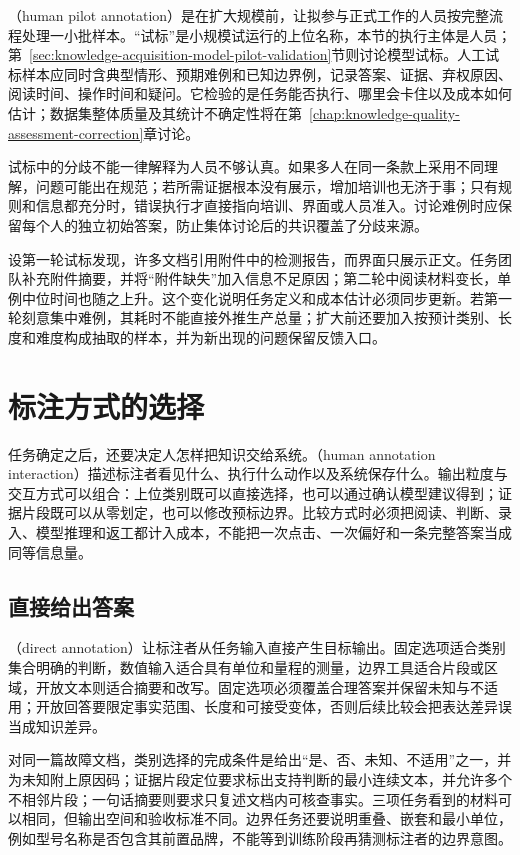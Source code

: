 （human pilot annotation）是在扩大规模前，让拟参与正式工作的人员按完整流程处理一小批样本。“试标”是小规模试运行的上位名称，本节的执行主体是人员；第~\ref{sec:knowledge-acquisition-model-pilot-validation}节则讨论模型试标。人工试标样本应同时含典型情形、预期难例和已知边界例，记录答案、证据、弃权原因、阅读时间、操作时间和疑问。它检验的是任务能否执行、哪里会卡住以及成本如何估计；数据集整体质量及其统计不确定性将在第~\ref{chap:knowledge-quality-assessment-correction}章讨论。

试标中的分歧不能一律解释为人员不够认真。如果多人在同一条款上采用不同理解，问题可能出在规范；若所需证据根本没有展示，增加培训也无济于事；只有规则和信息都充分时，错误执行才直接指向培训、界面或人员准入。讨论难例时应保留每个人的独立初始答案，防止集体讨论后的共识覆盖了分歧来源。

设第一轮试标发现，许多文档引用附件中的检测报告，而界面只展示正文。任务团队补充附件摘要，并将“附件缺失”加入信息不足原因；第二轮中阅读材料变长，单例中位时间也随之上升。这个变化说明任务定义和成本估计必须同步更新。若第一轮刻意集中难例，其耗时不能直接外推生产总量；扩大前还要加入按预计类别、长度和难度构成抽取的样本，并为新出现的问题保留反馈入口。

\section{标注方式的选择}
\label{sec:knowledge-acquisition-human-interaction}

任务确定之后，还要决定人怎样把知识交给系统。（human annotation interaction）描述标注者看见什么、执行什么动作以及系统保存什么。输出粒度与交互方式可以组合：上位类别既可以直接选择，也可以通过确认模型建议得到；证据片段既可以从零划定，也可以修改预标边界。比较方式时必须把阅读、判断、录入、模型推理和返工都计入成本，不能把一次点击、一次偏好和一条完整答案当成同等信息量。

\subsection{直接给出答案}
\label{sec:knowledge-acquisition-human-direct-answer}

（direct annotation）让标注者从任务输入直接产生目标输出。固定选项适合类别集合明确的判断，数值输入适合具有单位和量程的测量，边界工具适合片段或区域，开放文本则适合摘要和改写。固定选项必须覆盖合理答案并保留未知与不适用；开放回答要限定事实范围、长度和可接受变体，否则后续比较会把表达差异误当成知识差异。

对同一篇故障文档，类别选择的完成条件是给出“是、否、未知、不适用”之一，并为未知附上原因码；证据片段定位要求标出支持判断的最小连续文本，并允许多个不相邻片段；一句话摘要则要求只复述文档内可核查事实。三项任务看到的材料可以相同，但输出空间和验收标准不同。边界任务还要说明重叠、嵌套和最小单位，例如型号名称是否包含其前置品牌，不能等到训练阶段再猜测标注者的边界意图。


